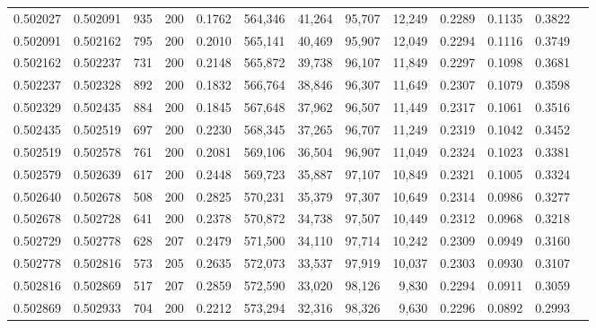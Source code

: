 \begin{tabular}{rrrrrrrrrrrrr}
0.502027 & 0.502091 &   935 & 200 &                                     0.1762 & 564,346 &  41,264 &  95,707 &  12,249 & 0.2289 & 0.1135 & 0.3822 \\
0.502091 & 0.502162 &   795 & 200 &                                     0.2010 & 565,141 &  40,469 &  95,907 &  12,049 & 0.2294 & 0.1116 & 0.3749 \\
0.502162 & 0.502237 &   731 & 200 &                                     0.2148 & 565,872 &  39,738 &  96,107 &  11,849 & 0.2297 & 0.1098 & 0.3681 \\
0.502237 & 0.502328 &   892 & 200 &                                     0.1832 & 566,764 &  38,846 &  96,307 &  11,649 & 0.2307 & 0.1079 & 0.3598 \\
0.502329 & 0.502435 &   884 & 200 &                                     0.1845 & 567,648 &  37,962 &  96,507 &  11,449 & 0.2317 & 0.1061 & 0.3516 \\
0.502435 & 0.502519 &   697 & 200 &                                     0.2230 & 568,345 &  37,265 &  96,707 &  11,249 & 0.2319 & 0.1042 & 0.3452 \\
0.502519 & 0.502578 &   761 & 200 &                                     0.2081 & 569,106 &  36,504 &  96,907 &  11,049 & 0.2324 & 0.1023 & 0.3381 \\
0.502579 & 0.502639 &   617 & 200 &                                     0.2448 & 569,723 &  35,887 &  97,107 &  10,849 & 0.2321 & 0.1005 & 0.3324 \\
0.502640 & 0.502678 &   508 & 200 &                                     0.2825 & 570,231 &  35,379 &  97,307 &  10,649 & 0.2314 & 0.0986 & 0.3277 \\
0.502678 & 0.502728 &   641 & 200 &                                     0.2378 & 570,872 &  34,738 &  97,507 &  10,449 & 0.2312 & 0.0968 & 0.3218 \\
0.502729 & 0.502778 &   628 & 207 &                                     0.2479 & 571,500 &  34,110 &  97,714 &  10,242 & 0.2309 & 0.0949 & 0.3160 \\
0.502778 & 0.502816 &   573 & 205 &                                     0.2635 & 572,073 &  33,537 &  97,919 &  10,037 & 0.2303 & 0.0930 & 0.3107 \\
0.502816 & 0.502869 &   517 & 207 &                                     0.2859 & 572,590 &  33,020 &  98,126 &   9,830 & 0.2294 & 0.0911 & 0.3059 \\
0.502869 & 0.502933 &   704 & 200 &                                     0.2212 & 573,294 &  32,316 &  98,326 &   9,630 & 0.2296 & 0.0892 & 0.2993 \\

\end{tabular}
